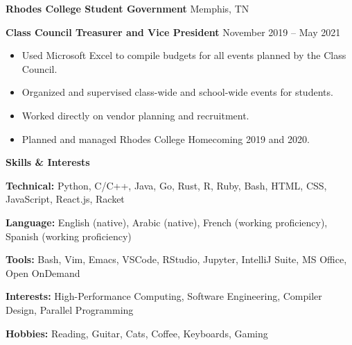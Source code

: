 \documentclass[11pt]{article}
\begin{document}
\textbf{Rhodes College Student Government}	\hfill Memphis, TN

\textbf{Class Council Treasurer and Vice President} \hfill November 2019 – May 2021
\begin{itemize}[noitemsep]
    \item Used Microsoft Excel to compile budgets for all events planned by the Class Council.
    \item Organized and supervised class-wide and school-wide events for students.
    \item Worked directly on vendor planning and recruitment.
    \item Planned and managed Rhodes College Homecoming 2019 and 2020.
\end{itemize}
\vspace{12pt}

\begin{center}
    \textbf{Skills \& Interests}
\end{center}

\textbf{Technical:} Python, C/C++, Java, Go, Rust, R, Ruby, Bash, HTML, CSS, JavaScript, React.js, Racket

\textbf{Language:} English (native), Arabic (native), French (working proficiency), Spanish (working proficiency)

\textbf{Tools:} Bash, Vim, Emacs, VSCode, RStudio, Jupyter, IntelliJ Suite, MS Office, Open OnDemand

\textbf{Interests:} High-Performance Computing, Software Engineering, Compiler Design, Parallel Programming

\textbf{Hobbies:} Reading, Guitar, Cats, Coffee, Keyboards, Gaming
\end{document}
